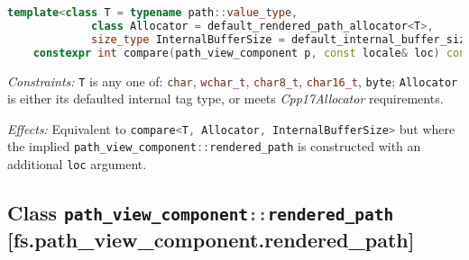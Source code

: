 \documentclass[11pt]{article}
\newcommand{\code}[2][cpp]{\lstinline[language=#1,basicstyle=\small\ttfamily]{#2}}
\newcommand{\desc}[1]{\textit{#1}}
\newcommand{\constraints}{\desc{Constraints: }}
\newcommand{\effects}{\desc{Effects: }}
\begin{document}
\color{darkgreen}

\begin{lstlisting}[language=cpp]
    template<class T = typename path::value_type,
             class Allocator = default_rendered_path_allocator<T>,
             size_type InternalBufferSize = default_internal_buffer_size>
    constexpr int compare(path_view_component p, const locale& loc) const;
\end{lstlisting}

\constraints \code{T} is any one of: \code{char}, \code{wchar_t}, \code{char8_t}, \code{char16_t}, \code{byte}; \code{Allocator} is either its defaulted internal tag type, or meets \emph{Cpp17Allocator} requirements.

\effects Equivalent to \code{compare<T, Allocator, InternalBufferSize>} but where the implied \code{path_view_component::rendered_path} is constructed with an additional \code{loc} argument.\\


\subsection*{Class \code{path_view_component::rendered_path} [fs.path\_view\_component.rendered\_path]}
\end{document}
